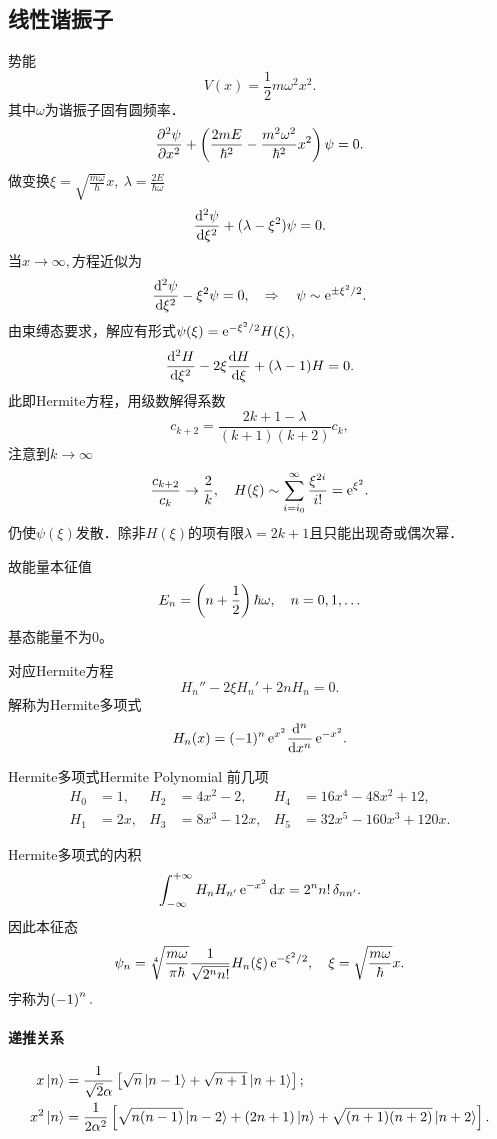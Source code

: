 \subsection{线性谐振子}
势能
\[
	V(x)=\frac12m\omega^2x^2.
\]
其中$\omega$为谐振子固有圆频率．
\[
	\pu 2\psi{x}+\kh{\frac{2mE}{\hbar^2}-\frac{m^2\omega^2}{\hbar^2}x^2}\psi=0.
\]
做变换$\xi=\sqrt{\frac{m\omega}\hbar}x,~\lambda=\frac{2E}{\hbar\omega}$
\[
	\dv[2]\psi\xi+(\lambda-\xi^2)\psi=0.
\]
当$x\to\infty,$方程近似为
\[
	\dv[2]\psi\xi-\xi^2\psi=0,\thus\psi\sim\e{\pm\xi^2/2}.
\]
由束缚态要求，解应有形式$\psi(\xi)=\e{-\xi^2/2}H(\xi),$
\[
	\dv[2] H\xi-2\xi\dv H\xi+(\lambda-1)H=0.
\]
此即Hermite方程，用级数解得系数
\[
	c_{k+2}=\frac{2k+1-\lambda}{(k+1)(k+2)}c_k,
\]
注意到$k\to\infty$
\[
	\frac{c_{k+2}}{c_k}\to\frac{2}k,\quad H(\xi)\sim\sum_{i=i_0}^\infty\frac{\xi^{2i}}{i!}=\e{\xi^2}.
\]
仍使$\psi(\xi)$发散．除非$H(\xi)$的项有限$\lambda=2k+1$且只能出现奇或偶次幂．

故能量本征值
\begin{align}
	E_n=\kh{n+\frac12}\hbar\omega,\quad n=0,1,\ldots
\end{align}
基态能量不为0。

对应Hermite方程
\[
	H_n''-2\xi H_n'+2nH_n=0.
\]
解称为Hermite多项式
\[
	H_n(x)=(-1)^n\e{x^2}\dd[n]x\e{-x^2}.
\]
\begin{example}{Hermite多项式}{Hermite Polynomial}
	前几项 %
	\begin{align*}
		H_0 & =1,  & H_2 & =4x^2-2,   & H_4 & =16x^4-48x^2+12,    \\
		H_1 & =2x, & H_3 & =8x^3-12x, & H_5 & =32x^5-160x^3+120x.
	\end{align*}
	\iffalse
		\begin{align*}
			\psi_0 & \propto e^{-\xi^2/2}            & \psi_3 & \propto\frac1{\sqrt3}(2\xi^3-3\xi),
			\psi_1 & \propto\sqrt2\xi e^{-\xi^2/2}   & \psi_4 & \propto\frac1{2\sqrt6}(4\xi^4-12\xi^3+3),     \\
			\psi_2 & \propto\frac1{\sqrt2}(2\xi^2-1) & \psi_6 & \propto\frac1{2\sqrt{30}}(4\xi^5-20\xi^3+15).
		\end{align*}
	\fi
\end{example}
Hermite多项式的内积
\[
	\int\iti H_nH_{n'}\e{-x^2}\d x=2^nn!\,\delta_{nn'}.
\]
因此本征态
\begin{align}
	\psi_n=\sqrt[4]{\frac{m\omega}{\pi\hbar}}\frac1{\sqrt{2^nn!}}H_n(\xi)\e{-\xi^2/2},\quad\xi=\sqrt{\frac{m\omega}\hbar}x.
\end{align}
宇称为$\kh{-1}^n.$
\paragraph*{递推关系}
{\small\begin{align}
	x\ket n&=\frac1{\sqrt2\alpha}\fkh{\sqrt n\ket{n-1}+\sqrt{n+1}\ket{n+1}};\\
	x^2\ket n&%
	=\frac1{2\alpha^2}\fkh{\sqrt{n(n-1)}\ket{n-2}+(2n+1)\ket n+\sqrt{(n+1)(n+2)}\ket{n+2}}.
\end{align}}
\clearpage

